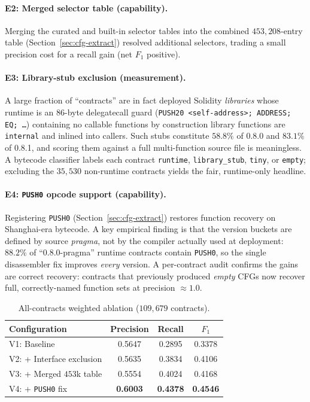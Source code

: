 \documentclass{article}
\begin{document}
\paragraph{E2: Merged selector table (capability).}
Merging the curated and built-in selector tables into the combined
$453{,}208$-entry table (Section~\ref{sec:cfg-extract}) resolved additional
selectors, trading a small precision cost for a recall gain (net $F_1$ positive).

\paragraph{E3: Library-stub exclusion (measurement).}
A large fraction of ``contracts'' are in fact deployed Solidity \emph{libraries}
whose runtime is an $86$-byte delegatecall guard
(\texttt{PUSH20 <self-address>; ADDRESS; EQ; \dots}) containing no callable
functions by construction library functions are \texttt{internal} and inlined into
callers. Such stubs constitute $58.8\%$ of 0.8.0 and $83.1\%$ of 0.8.1, and
scoring them against a full multi-function source file is meaningless. A bytecode
classifier labels each contract \texttt{runtime}, \texttt{library\_stub},
\texttt{tiny}, or \texttt{empty}; excluding the $35{,}530$ non-runtime contracts
yields the fair, runtime-only headline.

\paragraph{E4: \texttt{PUSH0} opcode support (capability).}
Registering \texttt{PUSH0} (Section~\ref{sec:cfg-extract}) restores function
recovery on Shanghai-era bytecode. A key empirical finding is that the version
buckets are defined by source \emph{pragma}, not by the compiler actually used at
deployment: $88.2\%$ of ``0.8.0-pragma'' runtime contracts contain \texttt{PUSH0},
so the single disassembler fix improves \emph{every} version. A per-contract audit
confirms the gains are correct recovery: contracts that previously produced
\emph{empty} CFGs now recover full, correctly-named function sets at precision
$\approx 1.0$.

\begin{table}[t]
\centering
\caption{All-contracts weighted ablation ($109{,}679$ contracts).}
\label{tab:ablation-all}
\small
\begin{tabular}{l c c c}
\toprule
Configuration & Precision & Recall & $F_1$ \\
\midrule
V1: Baseline                    & 0.5647 & 0.2895 & 0.3378 \\
V2: + Interface exclusion       & 0.5635 & 0.3834 & 0.4106 \\
V3: + Merged $453$k table       & 0.5554 & 0.4024 & 0.4168 \\
V4: + \texttt{PUSH0} fix        & \textbf{0.6003} & \textbf{0.4378} & \textbf{0.4546} \\
\bottomrule
\end{tabular}
\end{table}
\end{document}
